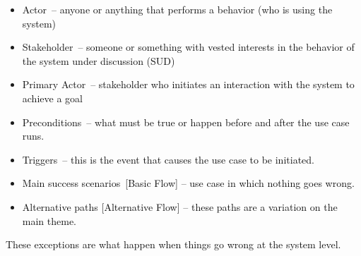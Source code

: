 \documentclass[12pt]{report}
\renewcommand{\_}{\kern-1.5pt\textunderscore\kern-1.5pt}
\begin{document}
\begin{itemize}
	\item \textcolor[HTML]{0D0D0D}{Actor – anyone or anything that performs a behavior (who is using the system)}\par

	\item \textcolor[HTML]{0D0D0D}{Stakeholder – someone or something with vested interests in the behavior of the system under discussion (SUD)}\par

	\item \textcolor[HTML]{0D0D0D}{Primary Actor – stakeholder who initiates an interaction with the system to achieve a goal}\par

	\item \textcolor[HTML]{0D0D0D}{Preconditions – what must be true or happen before and after the use case runs.}\par

	\item \textcolor[HTML]{0D0D0D}{Triggers – this is the event that causes the use case to be initiated.}\par

	\item \textcolor[HTML]{0D0D0D}{Main success scenarios [Basic Flow] – use case in which nothing goes wrong.}\par

	\item \textcolor[HTML]{0D0D0D}{Alternative paths [Alternative Flow] – these paths are a variation on the main theme. }
\end{itemize}\par


\vspace{\baselineskip}
\begin{adjustwidth}{0.2in}{0.84in}
\begin{justify}
\textcolor[HTML]{0D0D0D}{These exceptions are what happen when things go wrong at the system level.}
\end{justify}\par

\end{adjustwidth}


\vspace{\baselineskip}

\vspace{\baselineskip}


\end{document}
